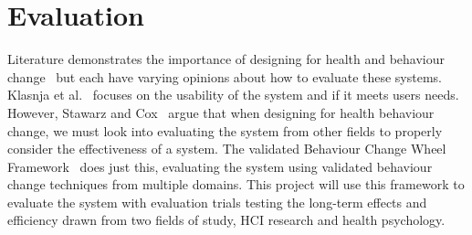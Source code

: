 
\newpage
\section{Evaluation}

Literature demonstrates the importance of designing for health and behaviour change~\cite{article_mhealth, article_designing_for_healthy_lifestyles, article_designing_for_health_behaviour_change_hci} but each have varying opinions about how to evaluate these systems. Klasnja et al.~\cite{article_evaluate_tech_health_behaviour_change} focuses on the usability of the system and if it meets users needs. However, Stawarz and Cox~\cite{article_designing_for_health_behaviour_change_hci} argue that when designing for health behaviour change, we must look into evaluating the system from other fields to properly consider the effectiveness of a system. The validated Behaviour Change Wheel Framework~\cite{article_behaviour_change_wheel} does just this, evaluating the system using validated behaviour change techniques from multiple domains. This project will use this framework to evaluate the system with evaluation trials testing the long-term effects and efficiency drawn from two fields of study, HCI research and health psychology.

